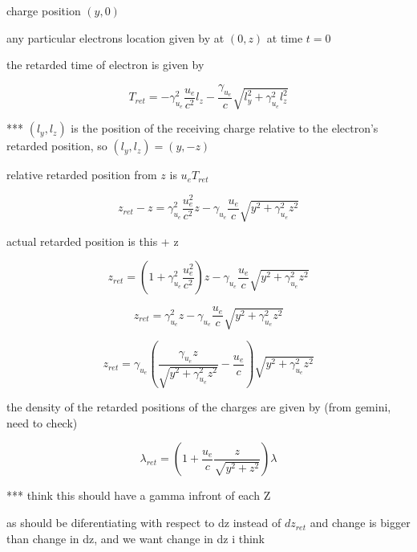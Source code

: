 charge position $(y,0)$

any particular electrons location given by at $(0,z)$ at time $t=0$

the retarded time of electron is given by

\begin{equation}
	T_{ret} = - \gamma_{u_e}^2\frac{u_e}{c^2} l_{z} - \frac{\gamma_{u_e}}{c}\sqrt{ l_{y}^2+\gamma_{u_e}^2 l_{z}^2}
\end{equation}


*** $(l_y,l_z)$ is the position of the receiving charge relative to the electron's retarded position, so $(l_y,l_z)= (y,-z)$

relative retarded position from $z$ is $u_e T_{ret}$

\begin{equation}
z_{ret} - z = \gamma_{u_e}^2\frac{u_e^2}{c^2} z - \gamma_{u_e}\frac{u_e}{c}\sqrt{ y^2+\gamma_{u_e}^2 z^2}
\end{equation}

actual retarded position is this + z

\begin{equation}
z_{ret} = (1+\gamma_{u_e}^2\frac{u_e^2}{c^2}) z - \gamma_{u_e}\frac{u_e}{c}\sqrt{ y^2+\gamma_{u_e}^2 z^2}
\end{equation}

\begin{equation}
z_{ret} = \gamma_{u_e}^2 z - \gamma_{u_e}\frac{u_e}{c}\sqrt{ y^2+\gamma_{u_e}^2 z^2}
\end{equation}

\begin{equation}
z_{ret} = \gamma_{u_e} \left(\frac{\gamma_{u_e} z}{\sqrt{ y^2+\gamma_{u_e}^2 z^2}} - \frac{u_e}{c} \right) \sqrt{ y^2+\gamma_{u_e}^2 z^2}
\end{equation}

the density of the retarded positions of the charges are given by (from gemini, need to check)

\begin{equation}
\lambda_{ret} = \left( 1 + \frac{u_e}{c}\frac{z}{\sqrt{ y^2+ z^2}} \right)\lambda
\end{equation}

*** think this should have a gamma infront of each Z

as should be diferentiating with respect to dz instead of $dz_{ret}$ and change is bigger than change in dz, and we want change in dz i think
